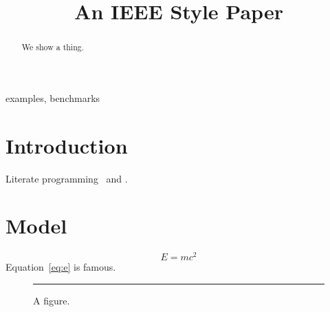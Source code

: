 \documentclass[conference]{IEEEtran}
\begin{document}
\title{An IEEE Style Paper}
\author{}
\maketitle
\begin{abstract}We show a thing.\end{abstract}
\begin{IEEEkeywords}examples, benchmarks\end{IEEEkeywords}
\section{Introduction}Literate programming~\cite{knuth84} and \cite{lamport94,dijkstra68}.
\section{Model}\begin{equation}E=mc^2\label{eq:e}\end{equation}Equation~\eqref{eq:e} is famous.
\begin{figure}[t]\centering\rule{3cm}{2cm}\caption{A figure.}\end{figure}

\end{document}

